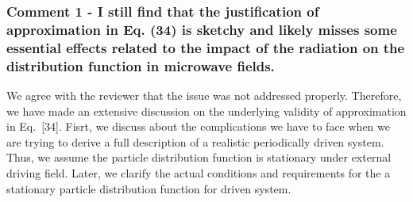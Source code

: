 \documentclass{article}
\begin{document}
\subsubsection*{Comment 1 -
\color{RoyalBlue} I still find that the justification of approximation in Eq. (34) is sketchy and likely misses some essential effects related to the impact of the radiation on the distribution function in microwave fields.}

We agree with the reviewer that the issue was not addressed properly. Therefore, we have made an extensive discussion on the underlying validity of approximation in Eq.~[34]. Fisrt, we discuss about the complications we have to face when we are trying to derive a full description of a realistic periodically driven system. Thus, we assume the particle distribution function is stationary under external driving field. Later, we clarify the actual conditions and requirements for the a stationary particle distribution function for driven system.
\end{document}
